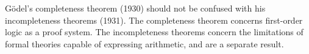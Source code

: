 \begin{remark*}
G\"{o}del's completeness theorem (1930) should not be confused with his
incompleteness theorems (1931). The completeness theorem concerns first-order
logic as a proof system. The incompleteness theorems concern the limitations of
formal theories capable of expressing arithmetic, and are a separate result.
\end{remark*}
